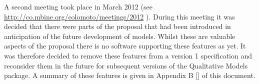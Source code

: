 A second meeting took place in March 2012 (see \url{http://co.mbine.org/colomoto/meetings/2012} ). During this meeting it was decided that there were parts of the proposal that had been introduced in anticipation of the future development of models. Whilst these are valuable aspects of the proposal there is no software supporting these features as yet. It was therefore decided to remove these features from a version 1 specification and reconsider them in the future for subsequent versions of the Qualitative Models package. A summary of these features is given in Appendix B \ref{} of this document.


